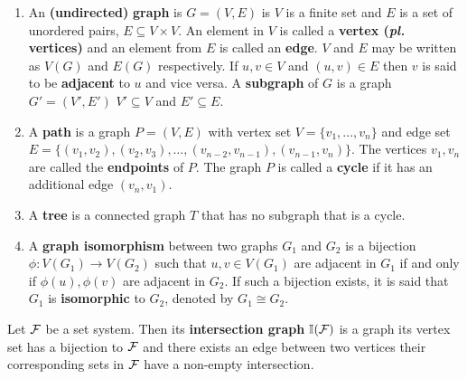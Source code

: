 \begin{definition}
  \label{def:graphtree}
  \begin{enumerate}
    \hangindent {}
  \item An \textbf{(undirected)} \textbf{graph} is $G = (V,E)$ is \stt $V$ is a
    finite set and $E$ is a set of unordered pairs, $E \subseteq V
    \times V$. An element in $V$ is called a \textbf{vertex
      (\emph{pl.} vertices)} and an element from $E$ is called an
    \textbf{edge}. $V$ and $E$ may be written as $V(G)$ and $E(G)$
    respectively. If $u,v \in V$ and $(u,v) \in E$ then $v$ is said to
    be \textbf{adjacent} to $u$ and vice versa. A \textbf{subgraph} of
    $G$ is a graph $G' = (V',E')$ \stt $V' \subseteq V$ and $E'
    \subseteq E$.

  \item A \textbf{path} is a graph $P = (V,E)$ with vertex set $V =
    \{v_1,\ldots,v_n\}$ and edge set $E= \{ (v_1,v_2),(v_2,v_3),
    \ldots,(v_{n-2},v_{n-1}),(v_{n-1},v_{n})\}$. The vertices $v_1,
    v_n$ are called the \textbf{endpoints} of $P$. The graph $P$ is
    called a \textbf{cycle} if it has an additional edge $(v_n,v_1)$.

  \item A \textbf{tree} is a connected graph $T$ that has no subgraph that is a
    cycle.

  \item A \textbf{graph isomorphism} between two graphs $G_1$ and
    $G_2$ is a bijection $\phi: V(G_1) \rightarrow V(G_2)$ such that
    $u, v \in V(G_1)$ are adjacent in $G_1$ if and only if $\phi(u),
    \phi(v)$ are adjacent in $G_2$. If such a bijection exists, it is
    said that $G_1$ is \textbf{isomorphic} to $G_2$, denoted by $G_1
    \cong G_2$.
  \end{enumerate}
\end{definition}


\begin{definition}
  \label{def:intersectiongraph}
  Let ${\cal F}$ be a set system. Then its \textbf{intersection graph}
  $\mathbb I({\cal F})$ is a graph \stt its vertex set has a bijection to ${\cal F}$
  and there exists an edge between two vertices \iff their
  corresponding sets in ${\cal F}$ have a non-empty intersection.
\end{definition}

